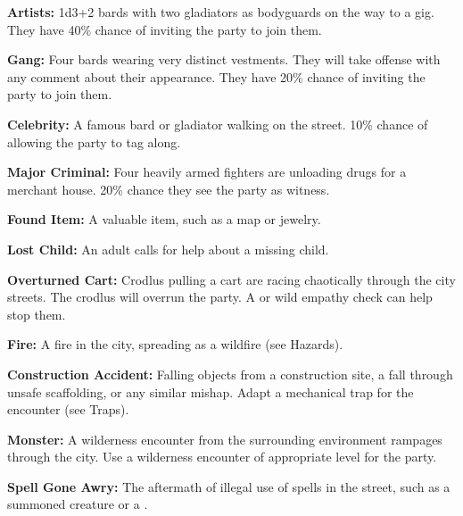 \textbf{Artists:} 1d3+2 bards with two gladiators as bodyguards on the way to a gig. They have 40\% chance of inviting the party to join them.

\textbf{Gang:} Four bards wearing very distinct vestments. They will take offense with any comment about their appearance. They have 20\% chance of inviting the party to join them.

\textbf{Celebrity:} A famous bard or gladiator walking on the street. 10\% chance of allowing the party to tag along.

\textbf{Major Criminal:} Four heavily armed fighters are unloading drugs for a merchant house. 20\% chance they see the party as witness.

\textbf{Found Item:} A valuable item, such as a map or jewelry.

\textbf{Lost Child:} An adult calls for help about a missing child.

\textbf{Overturned Cart:} Crodlus pulling a cart are racing chaotically through the city streets. The crodlus will overrun the party. A  or wild empathy check can help stop them.

\textbf{Fire:} A fire in the city, spreading as a wildfire (see Hazards).

\textbf{Construction Accident:} Falling objects from a construction site, a fall through unsafe scaffolding, or any similar mishap. Adapt a mechanical trap for the encounter (see Traps).

\textbf{Monster:} A wilderness encounter from the surrounding environment rampages through the city. Use a wilderness encounter of appropriate level for the party.

\textbf{Spell Gone Awry:} The aftermath of illegal use of spells in the street, such as a summoned creature or a .
